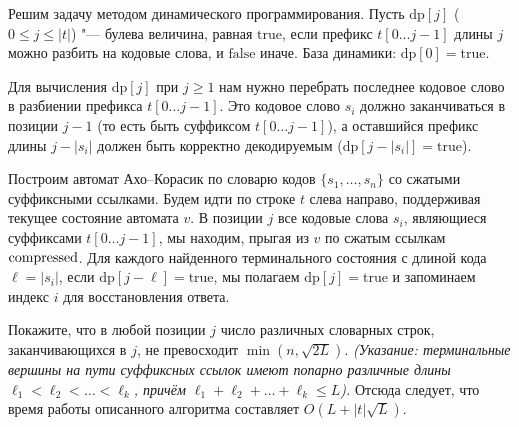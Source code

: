 \begin{solution}
    Решим задачу методом динамического программирования. Пусть $\text{dp}[j]$ ($0 \le j \le |t|$) "--- булева величина, равная $\text{true}$, если префикс $t[0 \dots j-1]$ длины $j$ можно разбить на кодовые слова, и $\text{false}$ иначе. База динамики: $\text{dp}[0] = \text{true}$.

    Для вычисления $\text{dp}[j]$ при $j \ge 1$ нам нужно перебрать последнее кодовое слово в разбиении префикса $t[0 \dots j-1]$. Это кодовое слово $s_i$ должно заканчиваться в позиции $j-1$ (то есть быть суффиксом $t[0 \dots j-1]$), а оставшийся префикс длины $j - |s_i|$ должен быть корректно декодируемым ($\text{dp}[j - |s_i|] = \text{true}$).

    Построим автомат Ахо--Корасик по словарю кодов $\{s_1, \dots, s_n\}$ со сжатыми суффиксными ссылками. Будем идти по строке $t$ слева направо, поддерживая текущее состояние автомата $v$. В позиции $j$ все кодовые слова $s_i$, являющиеся суффиксами $t[0 \dots j-1]$, мы находим, прыгая из $v$ по сжатым ссылкам $\operatorname{compressed}$. Для каждого найденного терминального состояния с длиной кода $\ell = |s_i|$, если $\text{dp}[j - \ell] = \text{true}$, мы полагаем $\text{dp}[j] = \text{true}$ и запоминаем индекс $i$ для восстановления ответа.

    \begin{exercise}
        Покажите, что в любой позиции $j$ число различных словарных строк, заканчивающихся в $j$, не превосходит $\min(n, \sqrt{2L})$. \textit{(Указание: терминальные вершины на пути суффиксных ссылок имеют попарно различные длины $\ell_1 < \ell_2 < \dots < \ell_k$, причём $\ell_1 + \ell_2 + \dots + \ell_k \le L$).} Отсюда следует, что время работы описанного алгоритма составляет $O(L + |t| \sqrt{L})$.
    \end{exercise}
\end{solution}
